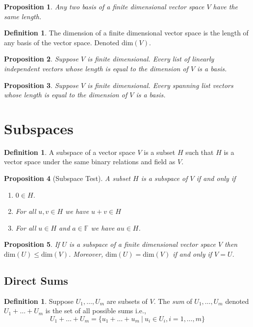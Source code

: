 \documentclass[12pt,letterpaper]{article}
\theoremstyle{plain}
\newtheorem{proposition}{Proposition}[section]
\theoremstyle{definition}
\newtheorem{definition}[theorem]{Definition}
\numberwithin{equation}{section}
\begin{document}
\begin{proposition} Any two basis of a finite dimensional vector space $V$ have the same length. 
\end{proposition}

\begin{definition} The dimension of a finite dimensional vector space is the length of any basis of the vector space. Denoted $\text{dim}(V)$. 
\end{definition}

\begin{proposition} Suppose $V$ is finite dimensional. Every list of linearly independent vectors whose length is equal to the dimension of $V$ is a basis. 
\end{proposition}

\begin{proposition} Suppose $V$ is finite dimensional. Every spanning list vectors whose length is equal to the dimension of $V$ is a basis. 
\end{proposition}

\section{Subspaces}
\begin{definition} A subspace of a vector space $V$ is a subset $H$ such that $H$ is a vector space under the same binary relations and field as $V$. 
\end{definition}

\begin{proposition}[Subspace Test] A subset $H$ is a subspace of $V$ if and only if 
\begin{enumerate}[1.] 
\item $0\in H$. 
\item For all $u,v\in H$ we have $u+v\in H$
\item For all $u\in H$ and $a\in \mathbb{F}$ we have $au\in H$.
\end{enumerate}
\end{proposition}

\begin{proposition} If $U$ is a subspace of a finite dimensional vector space $V$ then $\text{dim}(U)\leq\text{dim}(V)$. Moreover, $\text{dim}(U)=\text{dim}(V)$ if and only if $V=U$. 
\end{proposition}

\subsection{Direct Sums}
\begin{definition} Suppose $U_1,\ldots, U_m$ are subsets of $V$. The \emph{sum} of $U_1, \ldots, U_m$ denoted $U_1+\ldots+U_m$ is the set of all possible sums i.e., 
\[U_1+\ldots+U_m=\{u_1+\ldots+u_m\ |\ u_i\in U_i, i=1,\ldots, m\}\]
\end{definition}
\end{document}
